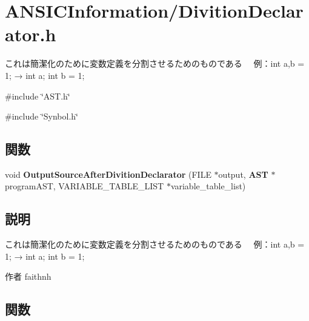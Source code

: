 \section{ANSICInformation/DivitionDeclarator.h}
\label{_divition_declarator_8h}


これは簡潔化のために変数定義を分割させるためのものである 　例：int a,b = 1; → int a; int b = 1;  


{\ttfamily \#include \char`\"{}AST.h\char`\"{}}\par
{\ttfamily \#include \char`\"{}Synbol.h\char`\"{}}\par
\subsection*{関数}
\begin{DoxyCompactItemize}
\item 
void {\bf OutputSourceAfterDivitionDeclarator} (FILE $\ast$output, {\bf AST} $\ast$programAST, VARIABLE\_\-TABLE\_\-LIST $\ast$variable\_\-table\_\-list)
\end{DoxyCompactItemize}


\subsection{説明}
これは簡潔化のために変数定義を分割させるためのものである 　例：int a,b = 1; → int a; int b = 1; \begin{DoxyAuthor}{作者}
faithnh 
\end{DoxyAuthor}


\subsection{関数}
